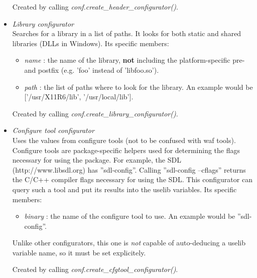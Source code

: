 \documentclass[a4paper,10pt]{article}
\begin{document}
\begin{itemize}
	Created by calling \emph{conf.create\_header\_configurator()}.

	\item \emph{Library configurator}\\
	Searches for a library in a list of paths. It looks for both static and shared libraries (DLLs in Windows).
	Its specific members:
	\begin{itemize}
		\item \emph{name} : the name of the library, {\bf not} including the platform-specific pre- and postfix (e.g. 'foo' instead of 'libfoo.so').
		\item \emph{path} : the list of paths where to look for the library. An example would be ['/usr/X11R6/lib', '/usr/local/lib'].
	\end{itemize}

	Created by calling \emph{conf.create\_library\_configurator()}.

	\item \emph{Configure tool configurator}\\
	Uses the values from configure tools (not to be confused with waf tools). Configure tools are package-specific helpers used for determining the flags necessary for using the package. For example, the SDL (http://www.libsdl.org) has ''sdl-config''. Calling ''sdl-config --cflags'' returns the C/C++ compiler flags necessary for using the SDL.
	This configurator can query such a tool and put its results into the uselib variables.
	Its specific members:
	\begin{itemize}
		\item \emph{binary} : the name of the configure tool to use. An example would be ''sdl-config''.
	\end{itemize}
	Unlike other configurators, this one is \emph{not} capable of auto-deducing a uselib variable name, so it must be set explicitely.

	Created by calling \emph{conf.create\_cfgtool\_configurator()}.


\end{itemize}
\end{document}
